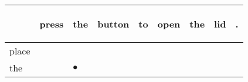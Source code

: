 \documentclass[landscape]{article}
\newcommand{\ssp}{\hspace{2pt}}
\newcommand{\mex}{\cellcolor{g}$\bullet$}
\begin{document}
\noindent\begin{tabular}{|l|p{10pt}|p{10pt}|p{10pt}|p{10pt}|p{10pt}|p{10pt}|p{10pt}|p{10pt}|}
\hline
&\begin{sideways}\cellcolor{ref0}press\hspace{12pt}\end{sideways}&\begin{sideways}\cellcolor{ref1}the\hspace{12pt}\end{sideways}&\begin{sideways}\cellcolor{ref2}button\hspace{12pt}\end{sideways}&\begin{sideways}\cellcolor{ref3}to\hspace{12pt}\end{sideways}&\begin{sideways}\cellcolor{ref4}open\hspace{12pt}\end{sideways}&\begin{sideways}\cellcolor{ref5}the\hspace{12pt}\end{sideways}&\begin{sideways}\cellcolor{ref6}lid\hspace{12pt}\end{sideways}&\begin{sideways}\cellcolor{ref7}.\hspace{12pt}\end{sideways}\\
\hline
\ssp place \ssp&\hspace{2pt}&\hspace{2pt}&\hspace{2pt}&\hspace{2pt}&\hspace{2pt}&\hspace{2pt}&\hspace{2pt}&\hspace{2pt}\\
\hline
\ssp \cellcolor{ref1}the \ssp&\hspace{2pt}&\hspace{2pt}\mex&\hspace{2pt}&\hspace{2pt}&\hspace{2pt}&\hspace{2pt}&\hspace{2pt}&\hspace{2pt}\\

\end{tabular}
\end{document}
